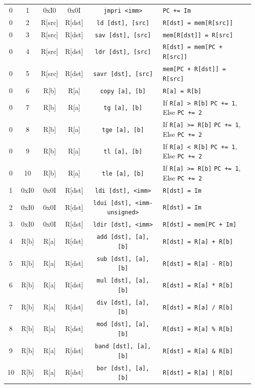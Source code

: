 \documentclass{article}
\begin{document}
\begin{table}[h!]
\begin{footnotesize}
\begin{tabular}{cccc|c|l}
			0 & 1 & 0xI0 & 0x0I & \texttt{jmpri <imm>} & \texttt{PC += Im} \\
			0 & 2 & R[src] & R[dst] & \texttt{ld [dst], [src]} & \texttt{R[dst] = mem[R[src]]} \\
			0 & 3 & R[src] & R[dst] & \texttt{sav [dst], [src]} & \texttt{mem[R[dst]] = R[src]} \\
			0 & 4 & R[src] & R[dst] & \texttt{ldr [dst], [src]} & \texttt{R[dst] = mem[PC + R[src]]} \\
			0 & 5 & R[src] & R[dst] & \texttt{savr [dst], [src]} & \texttt{mem[PC + R[dst]] = R[src]} \\
			0 & 6 & R[b] & R[a] & \texttt{copy [a], [b]} & \texttt{R[a] = R[b]} \\
			0 & 7 & R[b] & R[a] & \texttt{tg [a], [b]} & If \texttt{R[a] > R[b]} \texttt{PC += 1}, Else \texttt{PC += 2} \\
			0 & 8 & R[b] & R[a] & \texttt{tge [a], [b]} & If \texttt{R[a] >= R[b]} \texttt{PC += 1}, Else \texttt{PC += 2} \\
			0 & 9 & R[b] & R[a] & \texttt{tl [a], [b]} & If \texttt{R[a] < R[b]} \texttt{PC += 1}, Else \texttt{PC += 2} \\
			0 & 10 & R[b] & R[a] & \texttt{tle [a], [b]} & If \texttt{R[a] >= R[b]} \texttt{PC += 1}, Else \texttt{PC += 2}\\
			1 & 0xI0 & 0x0I & R[dst] & \texttt{ldi [dst], <imm>} & \texttt{R[dst] = Im} \\
			2 & 0xI0 & 0x0I & R[dst] & \texttt{ldui [dst], <imm-unsigned>} & \texttt{R[dst] = Im} \\
			3 & 0xI0 & 0x0I & R[dst] & \texttt{ldir [dst], <imm>} & \texttt{R[dst] = mem[PC + Im]} \\
			4 & R[b] & R[a] & R[dst] & \texttt{add [dst], [a], [b]} & \texttt{R[dst] = R[a] + R[b]} \\
			5 & R[b] & R[a] & R[dst] & \texttt{sub [dst], [a], [b]} & \texttt{R[dst] = R[a] - R[b]} \\
			6 & R[b] & R[a] & R[dst] & \texttt{mul [dst], [a], [b]} & \texttt{R[dst] = R[a] * R[b]} \\
			7 & R[b] & R[a] & R[dst] & \texttt{div [dst], [a], [b]} & \texttt{R[dst] = R[a] / R[b]} \\
			8 & R[b] & R[a] & R[dst] & \texttt{mod [dst], [a], [b]} & \texttt{R[dst] = R[a] \% R[b]} \\
			9 & R[b] & R[a] & R[dst] & \texttt{band [dst], [a], [b]} & \texttt{R[dst] = R[a] \& R[b]} \\
			10 & R[b] & R[a] & R[dst] & \texttt{bor [dst], [a], [b]} & \texttt{R[dst] = R[a] | R[b]} \\

\end{tabular}
\end{footnotesize}
\end{table}
\end{document}
